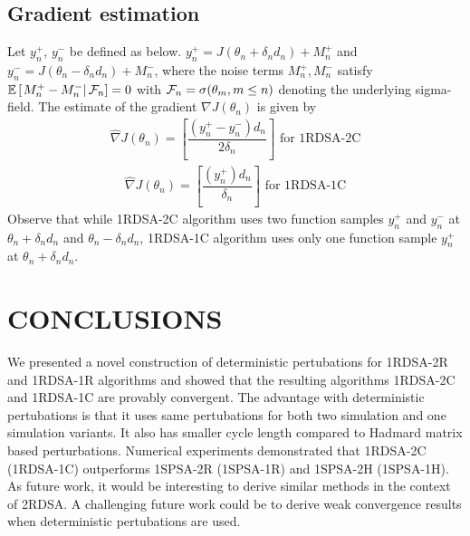 \documentclass[letterpaper, 10 pt, conference]{ieeeconf}  %
\begin{document}
\subsection{Gradient estimation}
Let $y_{n}^{+}$, $y_{n}^{-}$  be defined as below.
$y_{n}^{+} = J(\theta_n+\delta_n d_n) + M_{n}^{+}$ and 
$y_{n}^{-} = J(\theta_n-\delta_n d_n) + M_{n}^{-}$,
where the noise terms $M_{n}^{+}, M_{n}^{-}$ satisfy $\mathbb{E}\left[\left.M_{n}^{+}- 
M_{n}^{-}\right| \mathcal{F}_n\right] = 0$ with $\mathcal{F}_n = \sigma(\theta_m, m\le n)$ 
denoting the underlying sigma-field. 
The estimate of the gradient $\nabla J(\theta_n)$ is given by
\begin{align}
\label{eq:grad-twosided}
\widehat\nabla J(\theta_n)=
\left[\dfrac{(y_{n}^{+} - y_{n}^{-})d_n}{2\delta_n}\right] \text{ for 1RDSA-2C}
\end{align}
\begin{align}
\label{eq:grad-onesided}
\widehat\nabla J(\theta_n)=
\left[\dfrac{(y_{n}^{+})d_n}{\delta_n}\right] \text{ for 1RDSA-1C}
\end{align}
Observe that while 1RDSA-2C algorithm uses two function samples $y_{n}^{+}$ and $y_{n}^{-}$ 
at $\theta_n+\delta_n d_n$ and $\theta_n - \delta_n d_n$, 1RDSA-1C algorithm 
uses only one function sample $y_{n}^{+}$ at $\theta_n+\delta_n d_n$.







\section{CONCLUSIONS}
\label{sec:conclusions}
We presented a novel construction of deterministic pertubations for 
1RDSA-2R and 1RDSA-1R algorithms and showed that the resulting algorithms 
1RDSA-2C and 1RDSA-1C are provably convergent. 
The advantage with deterministic pertubations is that it uses 
same pertubations for both two simulation
and one simulation variants. It also has smaller cycle length compared to Hadmard matrix
based perturbations. Numerical experiments demonstrated that 1RDSA-2C (1RDSA-1C) outperforms 
1SPSA-2R (1SPSA-1R) and 1SPSA-2H (1SPSA-1H).
As future work, it would be interesting to derive similar methods in the context of 
2RDSA. A challenging future work could be to derive weak convergence results when
deterministic pertubations are used.



\end{document}
